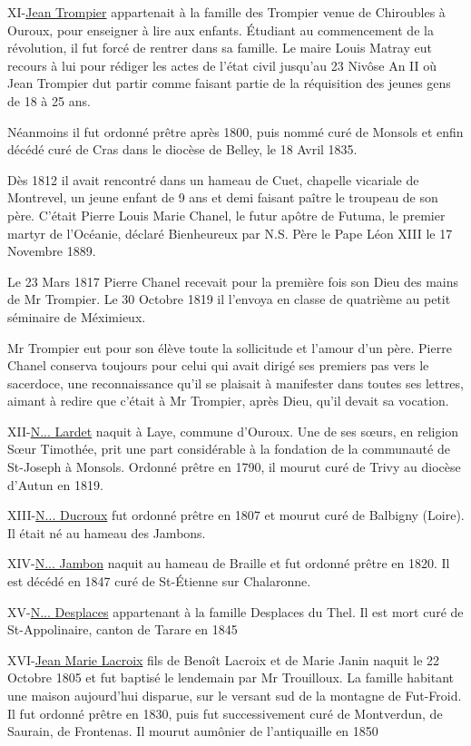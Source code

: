 XI-\underline{Jean Trompier} appartenait à la famille des Trompier venue de Chiroubles à Ouroux, pour enseigner à lire aux enfants. Étudiant au commencement de la révolution, il fut forcé de rentrer dans sa famille. Le maire Louis Matray eut recours à lui pour rédiger les actes de l'état civil jusqu'au 23 Nivôse An II où Jean Trompier dut partir comme faisant partie de la réquisition des jeunes gens de 18 à 25 ans.

Néanmoins il fut ordonné prêtre après 1800, puis nommé curé de Monsols et enfin décédé curé de Cras dans le diocèse de Belley, le 18 Avril 1835.

Dès 1812 il avait rencontré dans un hameau de Cuet, chapelle vicariale de Montrevel, un jeune enfant de 9 ans et demi faisant paître le troupeau de son père. C'était Pierre Louis Marie Chanel, le futur apôtre de Futuma, le premier martyr de l'Océanie, déclaré Bienheureux par N.S. Père le Pape Léon XIII le 17 Novembre 1889.

Le 23 Mars 1817 Pierre Chanel recevait pour la première fois son Dieu des mains de Mr Trompier. Le 30 Octobre 1819 il l'envoya en classe de quatrième au petit séminaire de Méximieux.

Mr Trompier eut pour son élève toute la sollicitude et l'amour d'un père. Pierre Chanel conserva toujours pour celui qui avait dirigé ses premiers pas vers le sacerdoce, une reconnaissance qu'il se plaisait à manifester dans toutes ses lettres, aimant à redire que c'était à Mr Trompier, après Dieu, qu'il devait sa vocation.

XII-\underline{N... Lardet} naquit à Laye, commune d'Ouroux. Une de ses sœurs, en religion Sœur Timothée, prit une part considérable à la fondation de la communauté de St-Joseph à Monsols. Ordonné prêtre en 1790, il mourut curé de Trivy au diocèse d'Autun en 1819.

XIII-\underline{N... Ducroux} fut ordonné prêtre en 1807 et mourut curé de Balbigny (Loire). Il était né au hameau des Jambons.

XIV-\underline{N... Jambon} naquit au hameau de Braille et fut ordonné prêtre en 1820. Il est décédé en 1847 curé de St-Étienne sur Chalaronne.

XV-\underline{N... Desplaces} appartenant à la famille Desplaces du Thel. Il est mort curé de St-Appolinaire, canton de Tarare en 1845

XVI-\underline{Jean Marie Lacroix} fils de Benoît Lacroix et de Marie Janin naquit le 22 Octobre 1805 et fut baptisé le lendemain par Mr Trouilloux. La famille habitant une maison aujourd'hui disparue, sur le versant sud de la montagne de Fut-Froid. Il fut ordonné prêtre en 1830, puis fut successivement curé de Montverdun, de Saurain, de Frontenas. Il mourut aumônier de l'antiquaille en 1850


